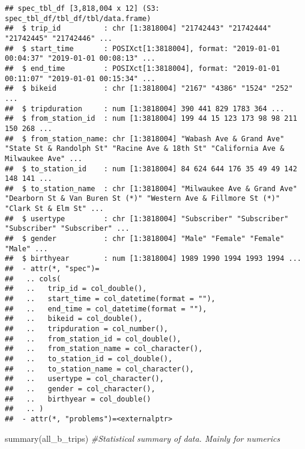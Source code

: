 \documentclass[
]{article}
\newenvironment{Shaded}{\begin{snugshade}}{\end{snugshade}}
\newcommand{\CommentTok}[1]{\textcolor[rgb]{0.56,0.35,0.01}{\textit{#1}}}
\newcommand{\FunctionTok}[1]{\textcolor[rgb]{0.00,0.00,0.00}{#1}}
\newcommand{\NormalTok}[1]{#1}
\begin{document}
\begin{verbatim}
## spec_tbl_df [3,818,004 x 12] (S3: spec_tbl_df/tbl_df/tbl/data.frame)
##  $ trip_id          : chr [1:3818004] "21742443" "21742444" "21742445" "21742446" ...
##  $ start_time       : POSIXct[1:3818004], format: "2019-01-01 00:04:37" "2019-01-01 00:08:13" ...
##  $ end_time         : POSIXct[1:3818004], format: "2019-01-01 00:11:07" "2019-01-01 00:15:34" ...
##  $ bikeid           : chr [1:3818004] "2167" "4386" "1524" "252" ...
##  $ tripduration     : num [1:3818004] 390 441 829 1783 364 ...
##  $ from_station_id  : num [1:3818004] 199 44 15 123 173 98 98 211 150 268 ...
##  $ from_station_name: chr [1:3818004] "Wabash Ave & Grand Ave" "State St & Randolph St" "Racine Ave & 18th St" "California Ave & Milwaukee Ave" ...
##  $ to_station_id    : num [1:3818004] 84 624 644 176 35 49 49 142 148 141 ...
##  $ to_station_name  : chr [1:3818004] "Milwaukee Ave & Grand Ave" "Dearborn St & Van Buren St (*)" "Western Ave & Fillmore St (*)" "Clark St & Elm St" ...
##  $ usertype         : chr [1:3818004] "Subscriber" "Subscriber" "Subscriber" "Subscriber" ...
##  $ gender           : chr [1:3818004] "Male" "Female" "Female" "Male" ...
##  $ birthyear        : num [1:3818004] 1989 1990 1994 1993 1994 ...
##  - attr(*, "spec")=
##   .. cols(
##   ..   trip_id = col_double(),
##   ..   start_time = col_datetime(format = ""),
##   ..   end_time = col_datetime(format = ""),
##   ..   bikeid = col_double(),
##   ..   tripduration = col_number(),
##   ..   from_station_id = col_double(),
##   ..   from_station_name = col_character(),
##   ..   to_station_id = col_double(),
##   ..   to_station_name = col_character(),
##   ..   usertype = col_character(),
##   ..   gender = col_character(),
##   ..   birthyear = col_double()
##   .. )
##  - attr(*, "problems")=<externalptr>
\end{verbatim}

\begin{Shaded}
\begin{Highlighting}[]
\FunctionTok{summary}\NormalTok{(all\_b\_trips)  }\CommentTok{\#Statistical summary of data. Mainly for numerics}
\end{Highlighting}
\end{Shaded}
\end{document}
